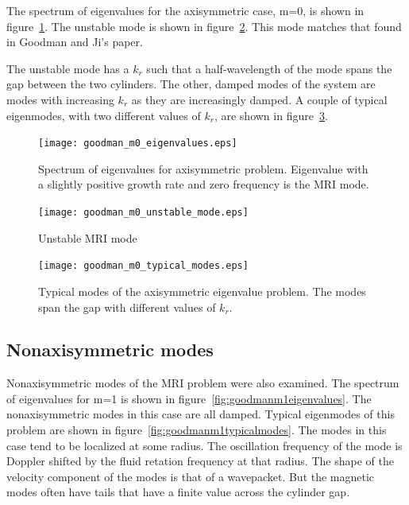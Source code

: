 \documentclass[letterpaper]{article}
\begin{document}
The spectrum of eigenvalues for the axisymmetric case, m=0, is shown
in figure~\ref{fig:goodmanm0eigenvalues}.  The unstable mode is shown
in figure~\ref{fig:goodmanm0unstablemode}.  This mode matches that
found in Goodman and Ji's paper.

The unstable mode has a $k_r$ such that a half-wavelength of the mode
spans the gap between the two cylinders.  The other, damped modes of
the system are modes with increasing $k_r$ as they are increasingly
damped.  A couple of typical eigenmodes, with two different values of
$k_r$, are shown in figure~\ref{fig:goodmanm0typicalmodes}.

\begin{figure}
\begin{center}
\texttt{[image: goodman\_m0\_eigenvalues.eps]}
\caption{Spectrum of eigenvalues for axisymmetric problem.  Eigenvalue
  with a slightly positive growth rate and zero frequency is the MRI
  mode.}
\label{fig:goodmanm0eigenvalues}
\end{center}
\end{figure}


\begin{figure}
\begin{center}
\texttt{[image: goodman\_m0\_unstable\_mode.eps]}
\caption{Unstable MRI mode}
\label{fig:goodmanm0unstablemode}
\end{center}
\end{figure}

\begin{figure}
\begin{center}
\texttt{[image: goodman\_m0\_typical\_modes.eps]}
\caption{Typical modes of the axisymmetric eigenvalue problem.  The
  modes span the gap with different values of $k_r$.}
\label{fig:goodmanm0typicalmodes}
\end{center}
\end{figure}

\subsection{Nonaxisymmetric modes}

Nonaxisymmetric modes of the MRI problem were also examined.  The
spectrum of eigenvalues for m=1 is shown in
figure~\ref{fig:goodmanm1eigenvalues}.  The nonaxisymmetric modes in
this case are all damped.  Typical eigenmodes of this problem are
shown in figure~\ref{fig:goodmanm1typicalmodes}.  The modes in this
case tend to be localized at some radius.  The oscillation frequency
of the mode is Doppler shifted by the fluid retation frequency at that
radius.  The shape of the velocity component of the modes is that of a
wavepacket.  But the magnetic modes often have tails that have a
finite value across the cylinder gap.
\end{document}
